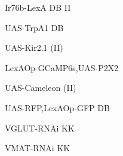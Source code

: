 \documentclass[17pt]{extarticle}
\begin{document}
\newpage{}
\vspace*{\fill}\begin{small}
Ir76b-LexA DB II \\[0.5em]
\end{small}
\footnotesize
\vspace*{\fill}
\newpage{}
\vspace*{\fill}\begin{normalsize}
UAS-TrpA1 DB \\[0.5em]
\end{normalsize}
\footnotesize
\vspace*{\fill}
\newpage{}
\vspace*{\fill}\begin{normalsize}
UAS-Kir2.1 (II) \\[0.5em]
\end{normalsize}
\footnotesize
\vspace*{\fill}
\newpage{}
\vspace*{\fill}\begin{footnotesize}
LexAOp-GCaMP6s,UAS-P2X2 \\[0.5em]
\end{footnotesize}
\footnotesize
\vspace*{\fill}
\newpage{}
\vspace*{\fill}\begin{small}
UAS-Cameleon (II) \\[0.5em]
\end{small}
\footnotesize
\vspace*{\fill}
\newpage{}
\vspace*{\fill}\begin{footnotesize}
UAS-RFP,LexAOp-GFP DB \\[0.5em]
\end{footnotesize}
\footnotesize
\vspace*{\fill}
\newpage{}
\vspace*{\fill}\begin{normalsize}
VGLUT-RNAi KK \\[0.5em]
\end{normalsize}
\footnotesize
\vspace*{\fill}
\newpage{}
\vspace*{\fill}\begin{normalsize}
VMAT-RNAi KK \\[0.5em]
\end{normalsize}
\footnotesize
\vspace*{\fill}
\end{document}
